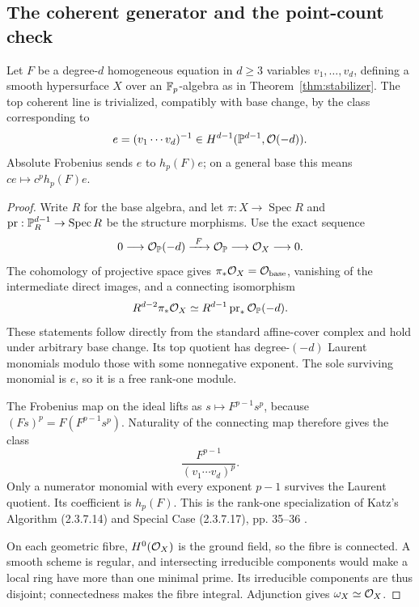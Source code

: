 \subsection{The coherent generator and the point-count check}
\begin{lemma}\label{lem:coherent}
Let $F$ be a degree-$d$ homogeneous equation in $d\ge3$ variables $v_1,\ldots,v_d$, defining a smooth hypersurface $X$ over an $\mathbb F_p$-algebra as in Theorem~\ref{thm:stabilizer}. The top coherent line is trivialized, compatibly with base change, by the class corresponding to
\[
e=(v_1\cdots v_d)^{-1}\in H^{d-1}(\mathbb P^{d-1},\mathcal O(-d)).
\]
Absolute Frobenius sends $e$ to $h_p(F)e$; on a general base this means $ce\mapsto c^p h_p(F)e$.
\end{lemma}
\begin{proof}
Write $R$ for the base algebra, and let
$\pi:X\to\operatorname{Spec}R$ and
$\operatorname{pr}:\mathbb P^{d-1}_R\to\operatorname{Spec}R$ be the
structure morphisms. Use the exact sequence
\[
0\longrightarrow\OO_{\PP}(-d)\xrightarrow{\ F\ }\OO_{\PP}
\longrightarrow\OO_X\longrightarrow0.
\]
The cohomology of projective space gives $\pi_*\mathcal O_X=\mathcal O_{\mathrm{base}}$, vanishing of the intermediate direct images, and a connecting isomorphism
\[
R^{d-2}\pi_*\mathcal O_X\simeq R^{d-1}\operatorname{pr}_*\mathcal O_{\mathbb P}(-d).
\]
These statements follow directly from the standard affine-cover complex and hold under arbitrary base change. Its top quotient has degree-$(-d)$ Laurent monomials modulo those with some nonnegative exponent. The sole surviving monomial is $e$, so it is a free rank-one module.

The Frobenius map on the ideal lifts as $s\mapsto F^{p-1}s^p$, because $(Fs)^p=F(F^{p-1}s^p)$. Naturality of the connecting map therefore gives the class
\[
\frac{F^{p-1}}{(v_1\cdots v_d)^p}.
\]
Only a numerator monomial with every exponent $p-1$ survives the Laurent quotient. Its coefficient is $h_p(F)$. This is the rank-one specialization of Katz's Algorithm (2.3.7.14) and Special Case (2.3.7.17), pp. 35--36 \citep{core-katz}.

On each geometric fibre, $H^0(\mathcal O_X)$ is the ground field, so the fibre is connected. A smooth scheme is regular, and intersecting irreducible components would make a local ring have more than one minimal prime. Its irreducible components are thus disjoint; connectedness makes the fibre integral. Adjunction gives $\omega_X\simeq\mathcal O_X$.
\end{proof}

